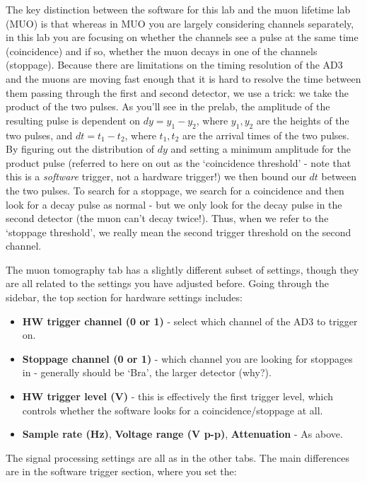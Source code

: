 \documentclass{../lab}
\begin{document}
The key distinction between the software for this lab and the muon lifetime lab (MUO) is that whereas in MUO you are largely considering channels separately, in this lab you are focusing on whether the channels see a pulse at the same time (coincidence) and if so, whether the muon decays in one of the channels (stoppage). Because there are limitations on the timing resolution of the AD3 and the muons are moving fast enough that it is hard to resolve the time between them passing through the first and second detector, we use a trick: we take the product of the two pulses. As you'll see in the prelab, the amplitude of the resulting pulse is dependent on $dy = y_1 - y_2$, where $y_1,y_2$ are the heights of the two pulses, and $dt = t_1 - t_2$, where $t_1, t_2$ are the arrival times of the two pulses. By figuring out the distribution of $dy$ and setting a minimum amplitude for the product pulse (referred to here on out as the `coincidence threshold' - note that this is a \textit{software} trigger, not a hardware trigger!) we then bound our $dt$ between the two pulses. To search for a stoppage, we search for a coincidence and then look for a decay pulse as normal - but we only look for the decay pulse in the second detector (the muon can't decay twice!). Thus, when we refer to the `stoppage threshold', we really mean the second trigger threshold on the second channel.

The muon tomography tab has a slightly different subset of settings, though they are all related to the settings you have adjusted before. Going through the sidebar, the top section for hardware settings includes:

\begin{itemize}
    \item \textbf{HW trigger channel (0 or 1)} - select which channel of the AD3 to trigger on.
    \item \textbf{Stoppage channel (0 or 1)} - which channel you are looking for stoppages in - generally should be `Bra', the larger detector (why?).
    \item \textbf{HW trigger level (V)} - this is effectively the first trigger level, which controls whether the software looks for a coincidence/stoppage at all.
    \item \textbf{Sample rate (Hz)}, \textbf{Voltage range (V p-p)}, \textbf{Attenuation} - As above.
\end{itemize}

The signal processing settings are all as in the other tabs. The main differences are in the software trigger section, where you set the:
\end{document}
